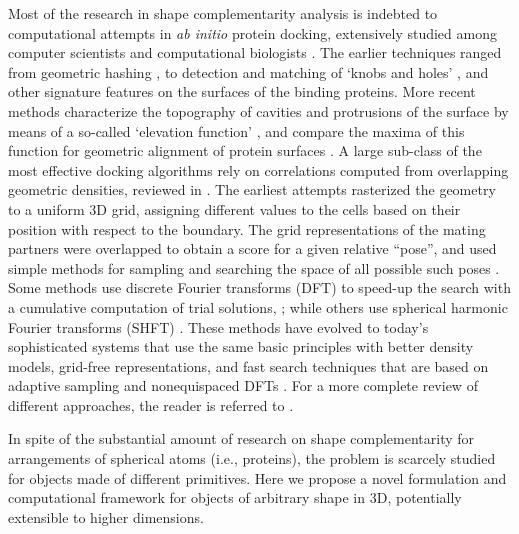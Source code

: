 \documentclass[article]{gmp2014}
\theoremstyle{definition}
\begin{document}
Most of the research in shape complementarity analysis is indebted to computational attempts in {\it ab initio} protein docking, extensively studied among computer scientists and computational biologists \cite{Ritchie2008a}.
%
The earlier techniques ranged from geometric hashing \cite{Lenhof1997,Duhovny2002}, to detection and matching of `knobs and holes' \cite{Wang1991,Shoichet1991,Lawrence1993}, and other signature features \cite{Jiang1991,Fischer1993,Duhovny2002} on the surfaces of the binding proteins. More recent methods characterize the topography of cavities and protrusions of the surface by means of a so-called `elevation function' \cite{Agarwal2006}, and compare the maxima of this function for geometric alignment of protein surfaces \cite{Wang2005}. A large sub-class of the most effective docking algorithms rely on correlations computed from overlapping geometric densities, reviewed in \cite{Eisenstein2004}. The earliest attempts rasterized the geometry to a uniform 3D grid, assigning different values to the cells based on their position with respect to the boundary. The grid representations of the mating partners were overlapped to obtain a score for a given relative ``pose'', and used simple methods for sampling and searching the space of all possible such poses \cite{Katchalski1992}. Some methods use discrete Fourier transforms (DFT) to speed-up the search with a cumulative computation of trial solutions, \cite{Gabb1997,Chen2003b,Kovacs2003,Kozakov2006}; while others use spherical harmonic Fourier transforms (SHFT) \cite{Max1988,Duncan1993,Ritchie2000,Ritchie2008}. These methods have evolved to today's sophisticated systems that use the same basic principles with better density models, grid-free representations, and fast search techniques that are based on adaptive sampling and nonequispaced DFTs \cite{Bajaj2011,Bajaj2013}. For a more complete review of different approaches, the reader is referred to \cite{Eisenstein2004,Ritchie2008a}.

In spite of the substantial amount of research on shape complementarity for arrangements of spherical atoms (i.e., proteins), the problem is scarcely studied for objects made of different primitives. Here we propose a novel formulation and computational framework for objects of arbitrary shape in 3D, potentially extensible to higher dimensions. %

\end{document}
